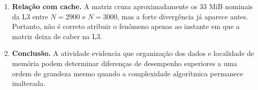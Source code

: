 \begin{enumerate}
    \item \textbf{Relação com cache.}
    A matriz cruza aproximadamente os 33 MiB nominais da L3 entre
    \(N=2900\) e \(N=3000\), mas a forte divergência já aparece antes.
    Portanto, não é correto atribuir o fenômeno apenas ao instante em que
    a matriz deixa de caber na L3.

    \item \textbf{Conclusão.}
    A atividade evidencia que organização dos dados e localidade de
    memória podem determinar diferenças de desempenho superiores a uma
    ordem de grandeza mesmo quando a complexidade algorítmica permanece
    inalterada.

\end{enumerate}